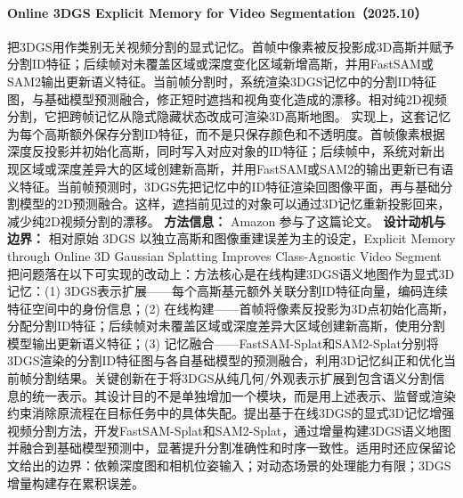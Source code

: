 \paragraph{Online 3DGS Explicit Memory for Video Segmentation（2025.10）\cite{2510_23521}}
把3DGS用作类别无关视频分割的显式记忆。首帧中像素被反投影成3D高斯并赋予分割ID特征；后续帧对未覆盖区域或深度变化区域新增高斯，并用FastSAM或SAM2输出更新语义特征。当前帧分割时，系统渲染3DGS记忆中的分割ID特征图，与基础模型预测融合，修正短时遮挡和视角变化造成的漂移。相对纯2D视频分割，它把跨帧记忆从隐式隐藏状态改成可渲染3D高斯地图。
实现上，这套记忆为每个高斯额外保存分割ID特征，而不是只保存颜色和不透明度。首帧像素根据深度反投影并初始化高斯，同时写入对应对象的ID特征；后续帧中，系统对新出现区域或深度差异大的区域创建新高斯，并用FastSAM或SAM2的输出更新已有语义特征。当前帧预测时，3DGS先把记忆中的ID特征渲染回图像平面，再与基础分割模型的2D预测融合。这样，遮挡前见过的对象可以通过3D记忆重新投影回来，减少纯2D视频分割的漂移。
\textbf{方法信息：} Amazon 参与了这篇论文。
\textbf{设计动机与边界：} 相对原始 3DGS 以独立高斯和图像重建误差为主的设定，Explicit Memory through Online 3D Gaussian Splatting Improves Class-Agnostic Video Segment 把问题落在以下可实现的改动上：方法核心是在线构建3DGS语义地图作为显式3D记忆：(1) 3DGS表示扩展——每个高斯基元额外关联分割ID特征向量，编码连续特征空间中的身份信息；(2) 在线构建——首帧将像素反投影为3D点初始化高斯，分配分割ID特征；后续帧对未覆盖区域或深度差异大区域创建新高斯，使用分割模型输出更新语义特征；(3) 记忆融合——FastSAM-Splat和SAM2-Splat分别将3DGS渲染的分割ID特征图与各自基础模型的预测融合，利用3D记忆纠正和优化当前帧分割结果。关键创新在于将3DGS从纯几何/外观表示扩展到包含语义分割信息的统一表示。其设计目的不是单独增加一个模块，而是用上述表示、监督或渲染约束消除原流程在目标任务中的具体失配。提出基于在线3DGS的显式3D记忆增强视频分割方法，开发FastSAM-Splat和SAM2-Splat，通过增量构建3DGS语义地图并融合到基础模型预测中，显著提升分割准确性和时序一致性。适用时还应保留论文给出的边界：依赖深度图和相机位姿输入；对动态场景的处理能力有限；3DGS增量构建存在累积误差。
